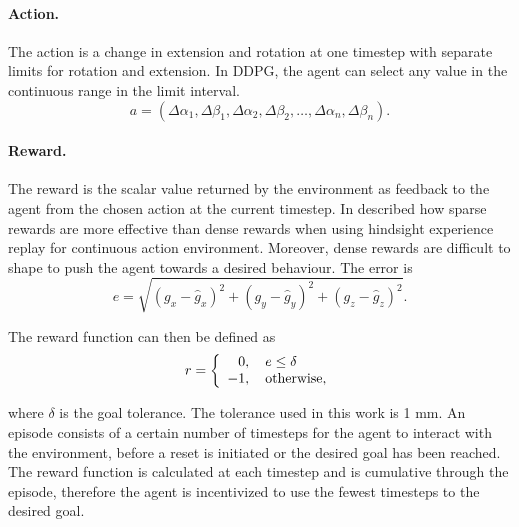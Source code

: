 \paragraph{Action.} The action is a change in extension and rotation at one timestep with separate limits for rotation and extension. In DDPG, the agent can select any value in the continuous range in the limit interval.
\begin{equation}
a = \left( \Delta \alpha_1, \Delta \beta_1, \Delta \alpha_2, \Delta \beta_2,  \dots, \Delta \alpha_n, \Delta \beta_n \right). \label{eqn:6}
\end{equation}

\paragraph{Reward.} The reward is the scalar value returned by the environment as feedback to the agent from the chosen action at the current timestep. In \cite{andrychowicz2017hindsight} described how sparse rewards are more effective than dense rewards when using hindsight experience replay for continuous action environment. Moreover, dense rewards are difficult to shape to push the agent towards a desired behaviour. The error is
\begin{equation}
e = \sqrt{(g_x - \hat{g}_x)^2 + (g_y - \hat{g}_y)^2 + (g_z - \hat{g}_z)^2}. \label{eqn:7}
\end{equation}

The reward function can then be defined as
\begin{equation}
r =
  \left\{
    \begin{array}{l}
      \hphantom{-}0, \quad e \leq \delta \\
      -1, \quad \textnormal{otherwise},
    \end{array}
  \right. \label{eqn:8}
\end{equation}

where $\delta$ is the goal tolerance. The tolerance used in this work is 1 mm. An episode consists of a certain number of timesteps for the agent to interact with the environment, before a reset is initiated or the desired goal has been reached. The reward function is calculated at each timestep and is cumulative through the episode, therefore the agent is incentivized to use the fewest timesteps to the desired goal.

